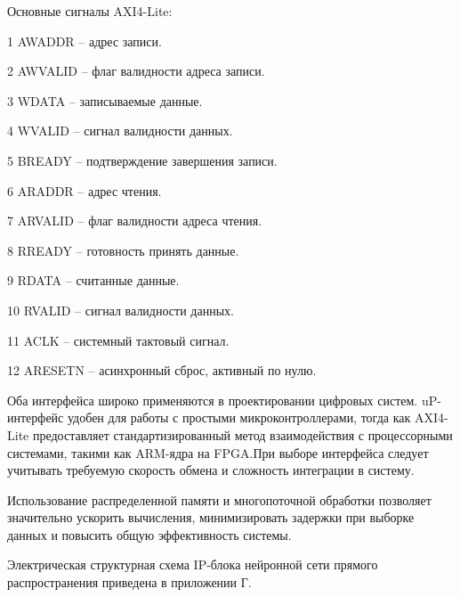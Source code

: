 Основные сигналы AXI4-Lite:

    1 {AWADDR} – адрес записи.

    2 {AWVALID} – флаг валидности адреса записи.

    3 {WDATA} – записываемые данные.

    4 {WVALID} – сигнал валидности данных.

    5 {BREADY} – подтверждение завершения записи.

    6 {ARADDR} – адрес чтения.

    7 {ARVALID} – флаг валидности адреса чтения.

    8 {RREADY} – готовность принять данные.

    9 {RDATA} – считанные данные.

    10 {RVALID} – сигнал валидности данных.

    11 {ACLK} – системный тактовый сигнал.

    12 {ARESETN} – асинхронный сброс, активный по нулю.

Оба интерфейса широко применяются в проектировании цифровых систем. 
uP-интерфейс удобен для работы с простыми микроконтроллерами, тогда как 
AXI4-Lite предоставляет стандартизированный метод взаимодействия с 
процессорными системами, такими как ARM-ядра на FPGA.\@ При выборе 
интерфейса следует учитывать требуемую скорость обмена и сложность 
интеграции в систему.

Использование распределенной памяти и многопоточной обработки позволяет 
значительно ускорить вычисления, минимизировать задержки при выборке данных и 
повысить общую эффективность системы.

Электрическая структурная схема IP-блока нейронной сети прямого распространения 
приведена в приложении Г.